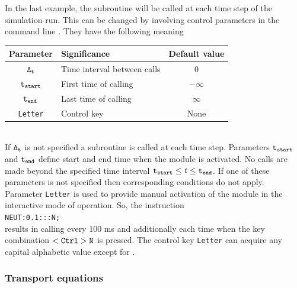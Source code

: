 In the last example, the subroutine will be called at each time step of
the simulation run. 
This can be changed by involving control parameters in the command
line .
They have the following meaning
\bigskip\\
\begin{tabular}{|c|l|c|}\hline
\bf Parameter	&\bf Significance &\bf Default value	\\
\hline
$\tt \Delta_t$	& Time interval between calls	& 0	\\
$\tt t_{start}$& First time of calling	&$-\infty$\\
$\tt t_{end}$& Last time of calling	&$\infty$\\
{\tt Letter} 	& Control key			& None	\\
\hline
\end{tabular}
\bigskip\\
If $\tt\Delta_t$ is not specified a subroutine is called at each time
step. 
Parameters $\tt t_{start}$ and $\tt t_{end}$ define start and end
time 
when the module is activated. No calls are made beyond the specified time
interval $\tt t_{start}\leq{\it t}\leq t_{end}$.
If one of these parameters is not specified then corresponding conditions
do not apply.
Parameter {\tt Letter} is used to provide manual activation of the module
in the interactive mode of operation.
So, the instruction 
\\
{\tt\hspace*{3em}NEUT:0.1:::N;} 
\\
results in calling  every 100 ms and additionally each time
when the key combination ${\tt<Ctrl>N}$ is pressed. 
The control key {\tt Letter} can acquire any capital alphabetic value
except for .

\subsubsection{Transport equations}

